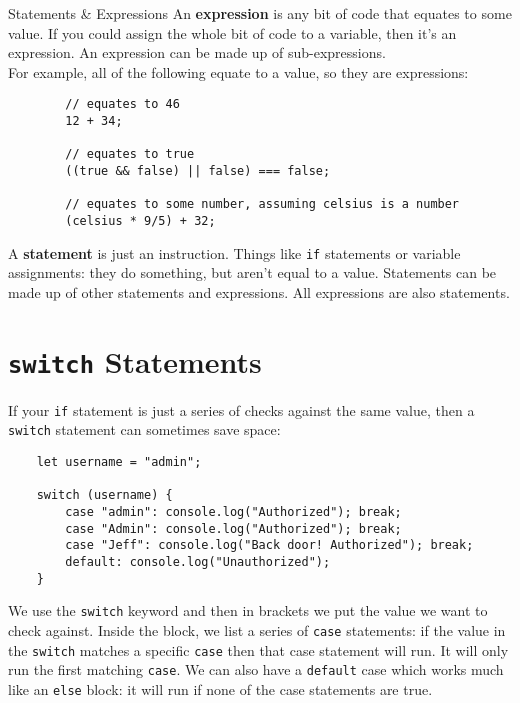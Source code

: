 \begin{infobox}{Statements \& Expressions}
    An \textbf{expression} is any bit of code that equates to some value. If you could assign the whole bit of code to a variable, then it's an expression. An expression can be made up of sub-expressions.
    \\

    For example, all of the following equate to a value, so they are expressions:

    \begin{verbatim}
        // equates to 46
        12 + 34;

        // equates to true
        ((true && false) || false) === false;

        // equates to some number, assuming celsius is a number
        (celsius * 9/5) + 32;
    \end{verbatim}

    A \textbf{statement} is just an instruction. Things like \texttt{if} statements or variable assignments: they do something, but aren't equal to a value. Statements can be made up of other statements and expressions. All expressions are also statements.

\end{infobox}

\pagebreak

\section{\texttt{switch} Statements}

If your \texttt{if} statement is just a series of checks against the same value, then a \texttt{switch} statement can sometimes save space:


\begin{verbatim}
    let username = "admin";

    switch (username) {
        case "admin": console.log("Authorized"); break;
        case "Admin": console.log("Authorized"); break;
        case "Jeff": console.log("Back door! Authorized"); break;
        default: console.log("Unauthorized");
    }
\end{verbatim}

We use the \texttt{switch} keyword and then in brackets we put the value we want to check against. Inside the block, we list a series of \texttt{case} statements: if the value in the \texttt{switch} matches a specific \texttt{case} then that case statement will run. It will only run the first matching \texttt{case}. We can also have a \texttt{default} case which works much like an \texttt{else} block: it will run if none of the case statements are true.
\\

